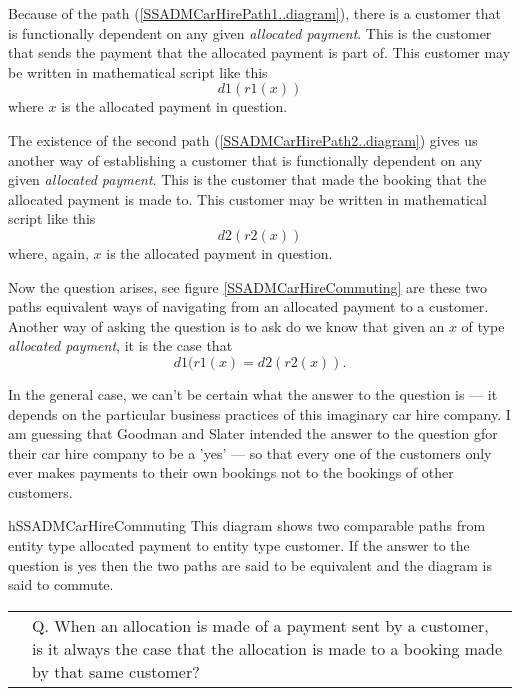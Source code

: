 Because of the path (\ref{SSADMCarHirePath1..diagram}),
there is a customer that is functionally dependent on any 
given  \textit{allocated payment}. This is the customer that sends the payment that the allocated payment is part of. This customer may be written in mathematical script like this
\begin{equation*}
d1(r1(x))
\end{equation*}
where $x$ is the allocated payment in question. 

The existence of the second path (\ref{SSADMCarHirePath2..diagram}) gives us another 
way of establishing a customer that is functionally dependent on any 
given  \textit{allocated payment}. This is the customer that made the booking
that the allocated payment is made to. This customer may be written in mathematical script like this
\begin{equation*}
d2(r2(x))
\end{equation*}
where, again, $x$ is the allocated payment in question. 

\mynote
Now the question arises, see figure \ref{SSADMCarHireCommuting} are these two paths equivalent ways of navigating from an allocated payment to a customer. 
Another way of asking the question is to ask do we know that given an $x$ of type \textit{allocated  payment}, it is the case that
\begin{equation*}
d1(r1(x) = d2(r2(x)).
\end{equation*}

\mynote
In the general case, we can't be certain what the answer to the question is ---
it depends on the particular business practices of this imaginary car hire company. 
I am guessing that Goodman and Slater intended the answer to the question gfor their car hire company to be a 'yes' ---  so that every one of the customers only ever makes payments to their own bookings not to the bookings of other customers.

\begin{erboxedFigure}{h}{SSADMCarHireCommuting}
{
This diagram  shows two comparable paths from entity type allocated payment to entity type customer. If the answer to the question is yes then  the two paths are said to be equivalent and the diagram is said to commute.}
\begin{tabular}{c  p{5.5cm}}
\raisebox{-2.8cm}{\scalebox{0.9}
{}}
&
Q. When an allocation is made of a payment sent by a customer, is it always the case that
the allocation is made to a booking made by that same customer? \\[0.2cm]
\end{tabular} 
\end{erboxedFigure}

